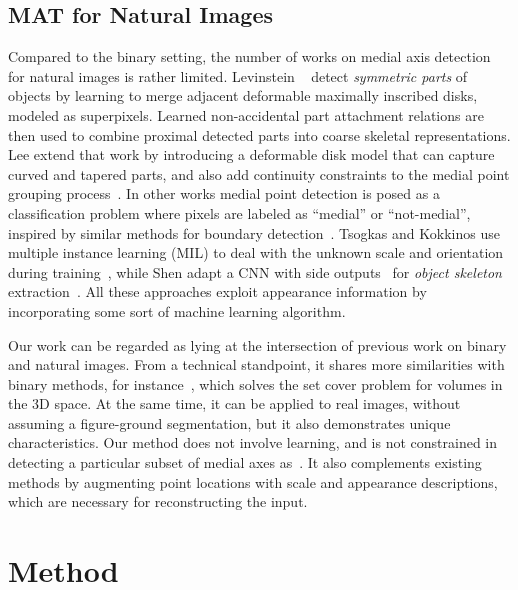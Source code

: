 \documentclass[10pt,twocolumn,letterpaper]{article}
\begin{document}
\subsection{MAT for Natural Images}\label{sec:related:natural}
Compared to the binary setting, the number of works on medial axis detection for natural images is rather limited.
Levinstein \etal~\cite{levinshtein2009multiscale} detect \emph{symmetric parts} of objects
by learning to merge adjacent deformable maximally inscribed disks, modeled as superpixels.
Learned non-accidental part attachment relations are then used to combine proximal detected parts into coarse skeletal representations.
Lee \etal extend that work by introducing a deformable disk model that can capture curved and tapered parts, and also add
continuity constraints to the medial point grouping process~\cite{lee2013detecting}.
In other works medial point detection is posed as a classification problem where pixels are labeled
as ``medial'' or ``not-medial'', inspired by similar methods for boundary detection~\cite{martin2004learning}.
Tsogkas and Kokkinos use multiple instance learning (MIL) to deal with the unknown scale and orientation 
during training~\cite{tsogkas2012learning}, while Shen \etal adapt a CNN with 
side outputs~\cite{xie2015holistically} for \emph{object skeleton} extraction~\cite{shen2016object}.
All these approaches exploit appearance information by incorporating some sort of machine learning algorithm.

Our work can be regarded as lying at the intersection of previous work on binary and natural images.
From a technical standpoint, it shares more similarities with binary methods, for instance~\cite{stolpner2012medial},
which solves the set cover problem for volumes in the 3D space.
At the same time, it can be applied to real images, without assuming a figure-ground segmentation,
but it also demonstrates unique characteristics.
Our method does not involve learning, and is not constrained in detecting a particular subset of
medial axes as~\cite{tsogkas2012learning,shen2016object}.
It also complements existing methods by augmenting point locations with scale and appearance descriptions, which
are necessary for reconstructing the input.


\section{Method}\label{sec:method}
\end{document}
